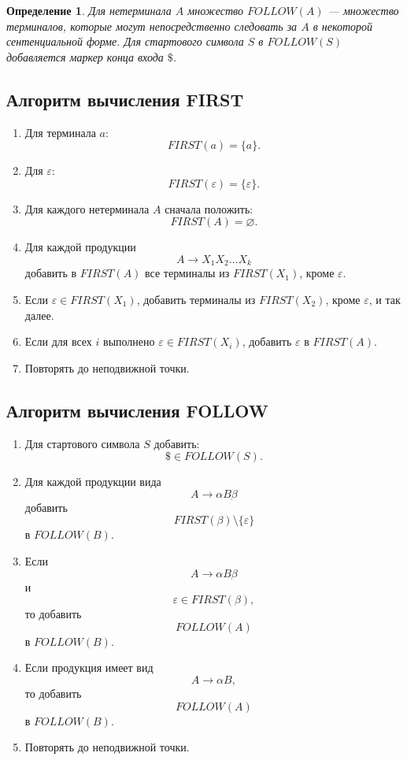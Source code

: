 \documentclass[12pt,a4paper]{article}
\newtheorem{definition}{Определение}
\begin{document}
\begin{definition}
Для нетерминала $A$ множество $FOLLOW(A)$ --- множество терминалов, которые могут непосредственно следовать за $A$ в некоторой сентенциальной форме. Для стартового символа $S$ в $FOLLOW(S)$ добавляется маркер конца входа $\$$.
\end{definition}

\subsection{Алгоритм вычисления FIRST}

\begin{enumerate}
    \item Для терминала $a$:
    \[
    FIRST(a)=\{a\}.
    \]
    \item Для $\varepsilon$:
    \[
    FIRST(\varepsilon)=\{\varepsilon\}.
    \]
    \item Для каждого нетерминала $A$ сначала положить:
    \[
    FIRST(A)=\varnothing.
    \]
    \item Для каждой продукции
    \[
    A \to X_1X_2\ldots X_k
    \]
    добавить в $FIRST(A)$ все терминалы из $FIRST(X_1)$, кроме $\varepsilon$.
    \item Если $\varepsilon \in FIRST(X_1)$, добавить терминалы из $FIRST(X_2)$, кроме $\varepsilon$, и так далее.
    \item Если для всех $i$ выполнено $\varepsilon \in FIRST(X_i)$, добавить $\varepsilon$ в $FIRST(A)$.
    \item Повторять до неподвижной точки.
\end{enumerate}

\subsection{Алгоритм вычисления FOLLOW}

\begin{enumerate}
    \item Для стартового символа $S$ добавить:
    \[
    \$ \in FOLLOW(S).
    \]
    \item Для каждой продукции вида
    \[
    A \to \alpha B \beta
    \]
    добавить
    \[
    FIRST(\beta)\setminus\{\varepsilon\}
    \]
    в $FOLLOW(B)$.
    \item Если
    \[
    A \to \alpha B \beta
    \]
    и
    \[
    \varepsilon \in FIRST(\beta),
    \]
    то добавить
    \[
    FOLLOW(A)
    \]
    в $FOLLOW(B)$.
    \item Если продукция имеет вид
    \[
    A \to \alpha B,
    \]
    то добавить
    \[
    FOLLOW(A)
    \]
    в $FOLLOW(B)$.
    \item Повторять до неподвижной точки.
\end{enumerate}
\end{document}
